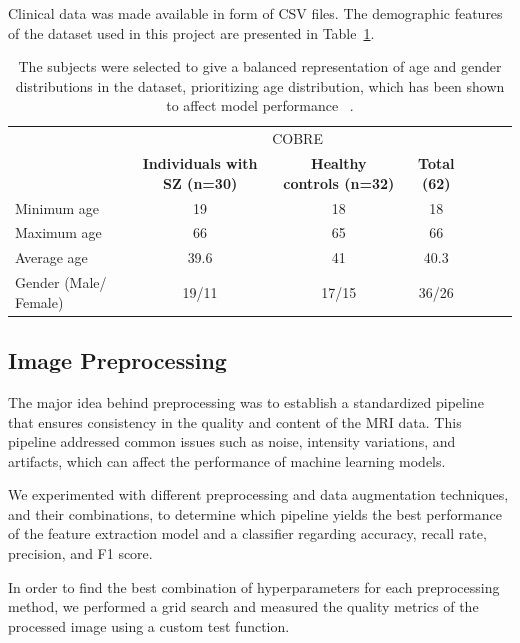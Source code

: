 Clinical data was made available in form of CSV files. The demographic features of the dataset used in this project are presented in Table~\ref{tab:cobre_clinical_demographic}.
\begin{center}
	\begin{table}
        \centering
        \caption{\label{tab:cobre_clinical_demographic}The subjects were selected to give a balanced representation of age and gender distributions in the dataset, prioritizing age distribution, which has been shown to affect model performance ~\cite{Oh2020}.}
        \begin{tabular*}{500pt}{@{\extracolsep\fill}lcccccc@{\extracolsep\fill}}
            \toprule
            & \multicolumn{3}{c}{COBRE}
            \\\cmidrule{2-4}
            & \textbf{Individuals with SZ (n=30)} & \textbf{Healthy controls (n=32)} & \textbf{Total (62)} \\
            \midrule
            Minimum age             & 19  & 18  & 18 \\
            Maximum age 		    & 66  & 65 & 66  \\
            Average age             & 39.6 & 41 & 40.3	\\
            Gender (Male/ Female)   & 19/11 & 17/15 & 36/26	\\
            \bottomrule
        \end{tabular*}
    \end{table}    
\end{center}

%
\subsection{Image Preprocessing}

The major idea behind preprocessing was to establish a standardized pipeline that ensures consistency in the quality and content of the MRI data. This pipeline addressed common issues such as noise, intensity variations, and artifacts, which can affect the performance of machine learning models.

We experimented with different preprocessing and data augmentation techniques, and their combinations, to determine which pipeline yields the best performance of the feature extraction model and a classifier regarding accuracy, recall rate, precision, and F1 score.

In order to find the best combination of hyperparameters for each preprocessing method, we performed a grid search and measured the quality metrics of the processed image using a custom test function.

